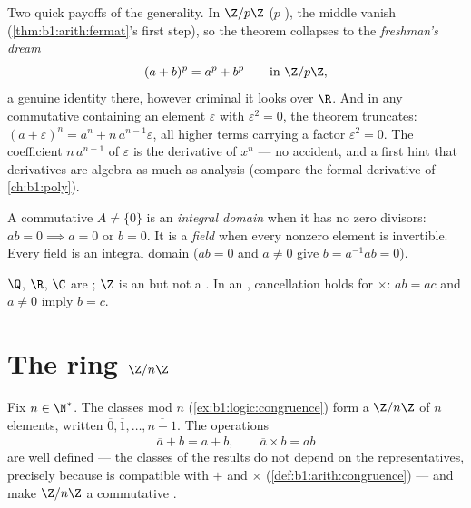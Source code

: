 \begin{example}\label{ex:b1:structures:binomialring}
Two quick payoffs of the generality. In $\Z/p\Z$ ($p$ ), the
middle  vanish
(\cref{thm:b1:arith:fermat}'s first step), so the theorem
collapses to the \emph{freshman's dream}
\[
(a + b)^p = a^p + b^p \qquad \text{in } \Z/p\Z ,
\]
a genuine identity there, however criminal it looks over $\R$.
And in any commutative  containing an element $\varepsilon$
with $\varepsilon^2 = 0$, the theorem truncates:
$(a + \varepsilon)^n = a^n + n\,a^{n-1}\varepsilon$, all higher
terms carrying a factor $\varepsilon^2 = 0$. The coefficient
$n\,a^{n-1}$ of $\varepsilon$ is the derivative of $x^n$ ---
no accident, and a first hint that derivatives are algebra as
much as analysis (compare the formal derivative of
\cref{ch:b1:poly}).
\end{example}

\begin{definition}\label{def:b1:structures:field}
A commutative  $A \neq \{0\}$ is an \emph{integral
domain} when it has no zero divisors: $ab = 0
\implies a = 0$ or $b = 0$. It is a \emph{field} when
every nonzero element is invertible. Every field is an integral
domain ($ab = 0$ and $a \neq 0$ give $b = a^{-1}ab = 0$).
\end{definition}

\begin{example}
$\Q$, $\R$, $\C$ are ; $\Z$ is an  but not a
. In an , cancellation holds for $\times$: $ab =
ac$ and $a \neq 0$ imply $b = c$.
\end{example}

\section{The ring $\Z/n\Z$}

\begin{definition}\label{def:b1:structures:zn}
Fix $n \in \N^*$. The  classes mod $n$
(\cref{ex:b1:logic:congruence}) form a 
$\Z/n\Z$ of $n$ elements, written $\overline 0,
\overline 1, \dots, \overline{n-1}$. The operations
\[
\overline a + \overline b = \overline{a + b},
\qquad
\overline a \times \overline b = \overline{ab}
\]
are well defined --- the classes of the results do not depend on the
representatives, precisely because  is compatible with $+$
and $\times$ (\cref{def:b1:arith:congruence}) --- and make $\Z/n\Z$ a
commutative .
\end{definition}

